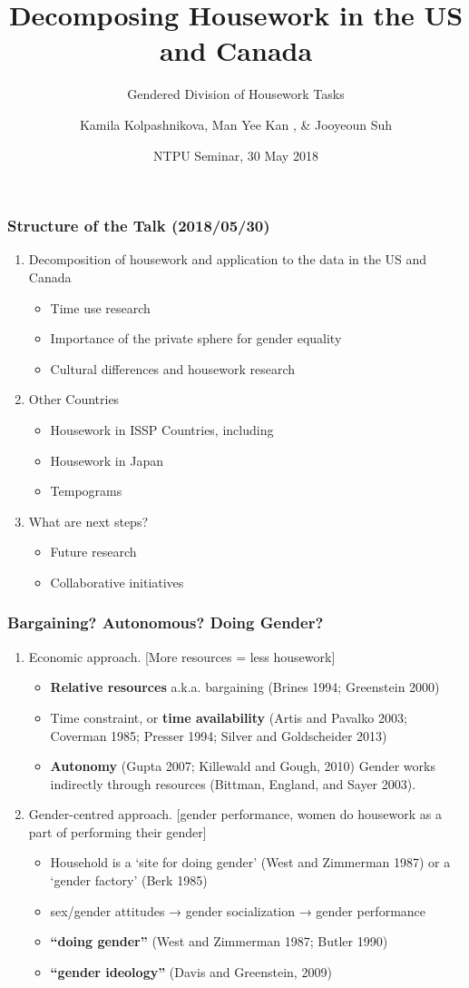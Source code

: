 \documentclass{beamer}
\title[Housework Research] %
{Decomposing Housework in the US and Canada}
\subtitle{Gendered Division of Housework Tasks}
\author[Kolpashnikova, Kamila] %
{Kamila Kolpashnikova\inst{1}, Man Yee Kan \inst{2}, \& Jooyeoun Suh \inst{3}}
\institute[NTPU] %
{
  \inst{1}%
  Visiting Scholar\\
  Department of Sociology\\
  National Taipei University  \\~\\
  \inst{2}%
  Department of Sociology\\
  University of Oxford  \\~\\
  \inst{3}%
  Institute for Women's Policy Research 
}
\date[Seminar 2018] %
{NTPU Seminar, 30 May 2018}
\begin{document}
 
\frame{\titlepage}
 
\begin{frame}
\frametitle{Structure of the Talk (2018/05/30)}
  \begin{enumerate}
  	\item  Decomposition of housework and application to the data in the US and Canada 
  	\begin{itemize}
  	\item Time use research
  	\item Importance of the private sphere for gender equality
  	\item Cultural differences and housework research
  	\end{itemize}
  \item Other Countries
    \begin{itemize}
  	\item Housework in ISSP Countries, including
  	\item Housework in Japan
  	\item Tempograms
  	\end{itemize}
  \item  What are next steps?
  	\begin{itemize}
  	\item Future research
  	\item Collaborative initiatives
  	\end{itemize}
  \end{enumerate}
\end{frame}

\begin{frame}
\frametitle{Bargaining? Autonomous? Doing Gender?}
  \begin{enumerate}
  	\item  Economic approach. [More resources = less housework] 
  	\begin{itemize}
  	\item \textbf{Relative resources} a.k.a. bargaining (Brines 1994; Greenstein 2000)
  	\item Time constraint, or \textbf{time availability} (Artis and Pavalko 2003; Coverman 1985; Presser 1994; Silver and Goldscheider 2013)
  	\item \textbf{Autonomy} (Gupta 2007; Killewald and Gough, 2010)
Gender works indirectly through resources (Bittman, England, and Sayer 2003).
  	\end{itemize}
  \item Gender-centred approach. [gender performance, women do housework as a part of performing their gender]
    \begin{itemize}
  	\item Household is a ‘site for doing gender’ (West and Zimmerman 1987) or a ‘gender factory’ (Berk 1985)
  	\item sex/gender attitudes → gender socialization → gender performance
  	\item  \textbf{“doing gender”} (West and Zimmerman 1987; Butler 1990)
  	\item \textbf{“gender ideology”} (Davis and Greenstein, 2009)
  	\end{itemize}
  \end{enumerate}
\end{frame}
\end{document}
